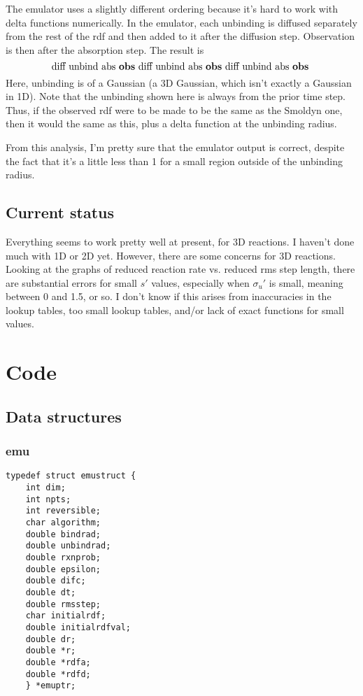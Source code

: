 \documentclass {book}
\begin{document}
The emulator uses a slightly different ordering because it's hard to work with delta functions numerically. In the emulator, each unbinding is diffused separately from the rest of the rdf and then added to it after the diffusion step. Observation is then after the absorption step. The result is
$$\textrm{diff unbind abs \textbf{obs} diff unbind abs \textbf{obs} diff unbind abs \textbf{obs} }$$
Here, unbinding is of a Gaussian (a 3D Gaussian, which isn't exactly a Gaussian in 1D). Note that the unbinding shown here is always from the prior time step. Thus, if the observed rdf were to be made to be the same as the Smoldyn one, then it would the same as this, plus a delta function at the unbinding radius.

From this analysis, I'm pretty sure that the emulator output is correct, despite the fact that it's a little less than 1 for a small region outside of the unbinding radius.

\section{Current status}

Everything seems to work pretty well at present, for 3D reactions. I haven't done much with 1D or 2D yet. However, there are some concerns for 3D reactions. Looking at the graphs of reduced reaction rate vs. reduced rms step length, there are substantial errors for small $s'$ values, especially when $\sigma_u'$ is small, meaning between 0 and 1.5, or so. I don't know if this arises from inaccuracies in the lookup tables, too small lookup tables, and/or lack of exact functions for small values.

\chapter{Code}

\section{Data structures}

\subsection{emu}

\begin{lstlisting}
typedef struct emustruct {
	int dim;
	int npts;
	int reversible;
	char algorithm;
	double bindrad;
	double unbindrad;
	double rxnprob;
	double epsilon;
	double difc;
	double dt;
	double rmsstep;
	char initialrdf;
	double initialrdfval;
	double dr;
	double *r;
	double *rdfa;
	double *rdfd;
	} *emuptr;
\end{lstlisting}
\end{document}
